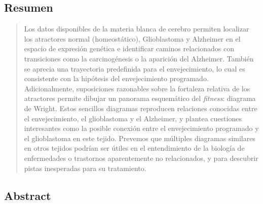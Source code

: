 \vfill

\begin{center}
\section*{Resumen}
\end{center}
\medskip

\begin{minipage}[c]{.9\linewidth}
\begin{quote}
	
{\large Los datos disponibles de la materia blanca de cerebro permiten localizar los atractores normal (homeostático), Glioblastoma y Alzheimer en el espacio de expresión genética e identificar caminos relacionados con transiciones como la carcinogénesis o la aparición del Alzheimer. También se aprecia una trayectoria predefinida para el envejecimiento, lo cual es consistente con la hipótesis del envejecimiento programado. Adicionalmente, suposiciones razonables sobre la fortaleza relativa de los atractores permite dibujar un panorama esquemático del \textit{fitness}: diagrama de Wright. Estos sencillos diagramas reproducen relaciones conocidas entre el envejecimiento, el glioblastoma y el Alzheimer, y plantea cuestiones interesantes como la posible conexión entre el envejecimiento programado y el glioblastoma en este tejido. Prevemos que múltiples diagramas similares en otros tejidos podrían ser útiles en el entendimiento de la biología de enfermedades o trastornos aparentemente no relacionados, y para descubrir pistas inesperadas para su tratamiento.}




\end{quote}
\end{minipage}

\smallskip
\vfill
\cleardoublepage


\begin{center}
\section*{Abstract}
\end{center}
\medskip

